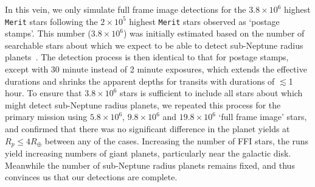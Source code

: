 In this vein, we only simulate full frame image detections for the $3.8\times10^6$ highest \texttt{Merit} stars following the $2\times10^5$ highest \texttt{Merit} stars observed as `postage stamps'.
This number ($3.8\times10^6$) was initially estimated based on the number of searchable stars about which we expect \tess to be able to detect sub-Neptune radius planets~\citep{winn_searchable_2013}.
The detection process is then identical to that for postage stamps, except with 30 minute instead of 2 minute exposures, which extends the effective durations and shrinks the apparent depths for transits with durations of $\lesssim$1 hour.
To ensure that $3.8\times10^6$ stars is sufficient to include all stars about which \tess might detect sub-Neptune radius planets, we repeated this process for the primary mission using $5.8\times10^6$, $9.8\times10^6$ and $19.8\times10^6$ `full frame image' stars, and confirmed that there was no significant difference in the planet yields at $R_p\le4R_\oplus$ between any of the cases. %
Increasing the number of FFI stars, the runs yield increasing numbers of giant planets, particularly near the galactic disk.
Meanwhile the number of sub-Neptune radius planets remains fixed, and thus convinces us that our detections are complete.

